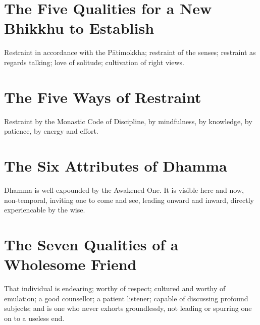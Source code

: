 
\ifhandbookedition
\vspace*{-\baselineskip}
\fi

\section*{The Five Qualities for a New Bhikkhu to Establish}

Restraint in accordance with the Pātimokkha; restraint of the senses; restraint
as regards talking; love of solitude; cultivation of right views.


\ifhandbookedition
\vspace*{-\baselineskip}
\fi

\section*{The Five Ways of Restraint}

Restraint by the Monastic Code of Discipline, by mindfulness, by knowledge, by
patience, by energy and effort.


\ifhandbookedition
\vspace*{-\baselineskip}
\fi

\section*{The Six Attributes of Dhamma}

Dhamma is well-expounded by the Awakened One. It is visible here and now,
non-temporal, inviting one to come and see, leading onward and inward, directly
experiencable by the wise.


\ifhandbookedition
\vspace*{-\baselineskip}
\fi

\section*{The Seven Qualities of a Wholesome Friend}


That individual is endearing; worthy of respect; cultured and worthy of
emulation; a good counsellor; a patient listener; capable of discussing profound
subjects; and is one who never exhorts groundlessly, not leading or spurring one
on to a useless end.

